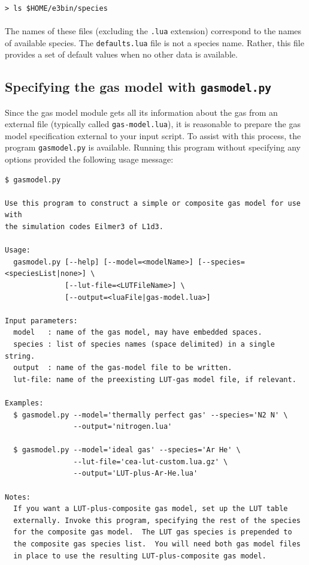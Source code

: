 \noindent
\topbar\\
\texttt{> ls \$HOME/e3bin/species}\\
\bottombar\\
%
The names of these files (excluding the \texttt{.lua} extension) correspond to the
names of available species.  The \texttt{defaults.lua} file is not a species name.
Rather, this file provides a set of default values when no other data is available.

\subsection{Specifying the gas model with \texttt{gasmodel.py}}
Since the gas model module gets all its information about the gas from an external
file (typically called \texttt{gas-model.lua}), it is reasonable to prepare the gas
model specification external to your input script.
To assist with this process, the program \texttt{gasmodel.py} is available.
Running this program without specifying any options provided the following usage message:

\noindent
{\footnotesize
\begin{verbatim}
$ gasmodel.py 

Use this program to construct a simple or composite gas model for use with
the simulation codes Eilmer3 of L1d3.

Usage: 
  gasmodel.py [--help] [--model=<modelName>] [--species=<speciesList|none>] \
              [--lut-file=<LUTFileName>] \
              [--output=<luaFile|gas-model.lua>]

Input parameters:
  model   : name of the gas model, may have embedded spaces.
  species : list of species names (space delimited) in a single string.
  output  : name of the gas-model file to be written.
  lut-file: name of the preexisting LUT-gas model file, if relevant.

Examples:
  $ gasmodel.py --model='thermally perfect gas' --species='N2 N' \
                --output='nitrogen.lua'

  $ gasmodel.py --model='ideal gas' --species='Ar He' \
                --lut-file='cea-lut-custom.lua.gz' \
                --output='LUT-plus-Ar-He.lua'

Notes:
  If you want a LUT-plus-composite gas model, set up the LUT table
  externally. Invoke this program, specifying the rest of the species
  for the composite gas model.  The LUT gas species is prepended to 
  the composite gas species list.  You will need both gas model files
  in place to use the resulting LUT-plus-composite gas model.
\end{verbatim}
} %

